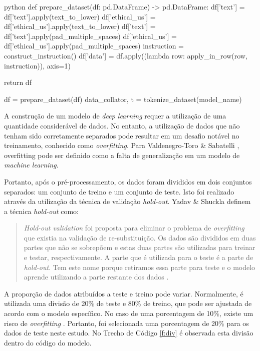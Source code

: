 \begin{code}
\label{f:prepare}
\begin{mintedbox}{python}
def prepare_dataset(df: pd.DataFrame) -> pd.DataFrame:
    df['text'] = df['text'].apply(text_to_lower)
    df['ethical_us'] = df['ethical_us'].apply(text_to_lower)
    df['text'] = df['text'].apply(pad_multiple_spaces)
    df['ethical_us'] = df['ethical_us'].apply(pad_multiple_spaces)
    instruction = construct_instruction()
    df['data'] = df.apply((lambda row: apply_in_row(row, instruction)), axis=1)
    
    return df

df = prepare_dataset(df)
data_collator, t = tokenize_dataset(model_name)
\end{mintedbox}
\end{code}

A construção de um modelo de \textit{deep learning} requer a utilização de uma quantidade considerável de dados. No entanto, a utilização de dados que não tenham sido corretamente separados pode resultar em um desafio notável no treinamento, conhecido como \textit{overfitting}. Para Valdenegro-Toro \& Sabatelli \cite{overfitting}, overfitting pode ser definido como a falta de generalização em um modelo de \textit{machine learning}.

Portanto, após o pré-processamento, os dados foram divididos em dois conjuntos separados: um conjunto de treino e um conjunto de teste. Isto foi realizado através da utilização da técnica de validação \textit{hold-out}. Yadav \& Shuckla \cite{yadav} definem a técnica \textit{hold-out} como:
\blockquote{\textit{Hold-out validation} foi proposta para eliminar o problema de \textit{overfitting} que existia na validação de re-substituição. Os dados são divididos em duas partes que não se sobrepõem e estas duas partes são utilizadas para treinar e testar, respectivamente. A parte que é utilizada para o teste é a parte de \textit{hold-out}. Tem este nome porque retiramos essa parte para teste e  o modelo aprende utilizando a parte restante dos dados \cite{yadav}.}

A proporção de dados atribuídos a teste e treino pode variar. Normalmente, é utilizada uma divisão de 20\% de teste e 80\% de treino, que pode ser ajustada de acordo com o modelo específico. No caso de uma porcentagem de 10\%, existe um risco de \textit{overfitting} \cite{yadav}. Portanto, foi selecionada uma porcentagem de 20\% para os dados de teste neste estudo. No Trecho de Código \ref{f:div} é observada esta divisão dentro do código do modelo.

